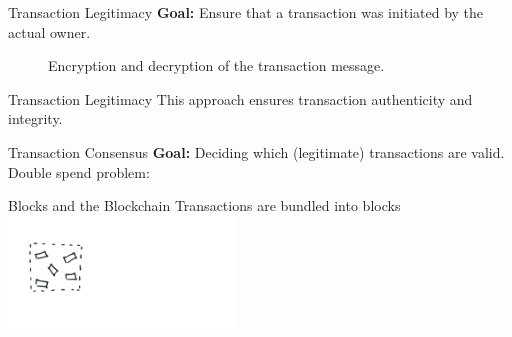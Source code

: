 \documentclass[]{beamer}
\begin{document}
\begin{frame}{Transaction Legitimacy}
\textbf{Goal:} Ensure that a transaction was initiated by the actual owner.\\ \vspace{1em}

	\begin{figure}[h!]
		\center
		
		\caption{Encryption and decryption of the transaction message.}
		\label{fig:asymmeinfach}
	\end{figure}
\end{frame}

\begin{frame}{Transaction Legitimacy}
	\vspace{1em}
This approach ensures transaction \color{focus}authenticity \color{black}and \color{focus}integrity\color{black}.
	\vspace{1em}
\uncover<1->{
	\begin{figure}[h!]
		\center
		
	\end{figure}
	}
\end{frame}

\begin{frame}{Transaction Consensus}
\textbf{Goal: }Deciding which (legitimate) transactions are valid. \\
\vspace{1em}
Double spend problem: \\
\begin{figure}[h!]
	\center
	
\end{figure}
\end{frame}

\begin{frame}{Blocks and the Blockchain}
Transactions are bundled into blocks \\
\includegraphics[width=6cm]{../assets/images/block_1.png} \\
\end{frame}
\end{document}
